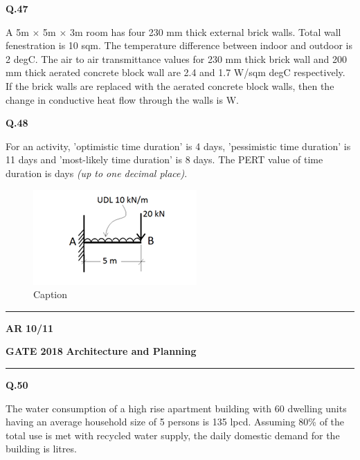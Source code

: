 \documentclass[journal,12pt,onecolumn]{IEEEtran}
\theoremstyle{remark}
\begin{document}
\vspace{0.3cm}
\noindent
\textbf{Q.47} \hspace{0.5cm} \parbox[t]{14.39959cm}{ A 5m $\times$ 5m $\times$ 3m room has four 230 mm thick external brick walls. Total wall fenestration is 10 sqm. The temperature difference between indoor and outdoor is 2 degC. The air to air transmittance values for 230 mm thick brick wall and 200 mm thick aerated concrete block wall are 2.4 and 1.7 W/sqm degC respectively. If the brick walls are replaced with the aerated concrete block walls, then the change in conductive heat flow through the walls is \underline{\hspace{3cm}} W.}

\vspace{01cm}

\noindent
\textbf{Q.48}\hspace{0.5cm} \parbox[t]{14.5cm}{ For an activity, 'optimistic time duration' is 4 days, 'pessimistic time duration' is 11 days and 'most-likely time duration' is 8 days. The PERT value of time duration is \underline{\hspace{2cm}} days \emph{(up to one decimal place)}.}

\begin{figure}[h]
    \centering
    \includegraphics[width=0.4\linewidth]{Figs/Screenshot 2025-08-16 133516.png}
    \caption{Caption}
    \label{fig:placeholder}
\end{figure}

\vspace{0.5cm}
 \noindent
\hrule \vspace{0.0875CM} \textbf{AR} \hfill  \textbf{10/11}

\newpage
\noindent
\textbf{GATE 2018} \hfill \textbf{Architecture and Planning}
\vspace{0.0012cm} \hrule
\vspace{1cm}


\noindent
\textbf{Q.50}\hspace{0.5cm} \parbox[t]{14.5cm}{ The water consumption of a high rise apartment building with 60 dwelling units having an average household size of 5 persons is 135 lpcd. Assuming 80\% of the total use is met with recycled water supply, the daily domestic demand for the building is \underline{\hspace{3cm}} litres.}
\end{document}
